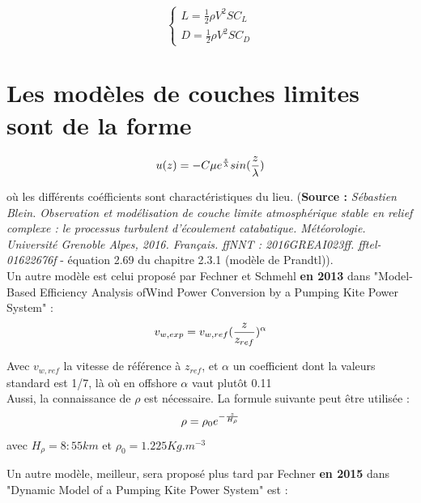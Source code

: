 \begin{equation}
    \begin{cases}
        L = \frac{1}{2} \rho V^2 SC_L \\
        D = \frac{1}{2} \rho V^2 SC_D 
    \end{cases}
    \label{eq:clcd}
\end{equation}

\section{Les modèles de couches limites sont de la forme } 
\label{sec:Ch2.4}

\begin{equation}
        u(z) = -C \mu e^{\frac{z}{\lambda}} sin(\frac{z}{\lambda}) \\
\end{equation}

où les différents coéfficients sont charactéristiques du lieu. (\textbf{Source :} \textit{Sébastien Blein. Observation et modélisation de couche limite atmosphérique stable en relief complexe : le processus turbulent d’écoulement catabatique. Météorologie. Université Grenoble Alpes, 2016. Français. ffNNT : 2016GREAI023ff. fftel-01622676f} - équation 2.69 du chapitre 2.3.1 (modèle de Prandtl)). \\

Un autre modèle est celui proposé par Fechner et Schmehl \textbf{en 2013} dans "Model-Based Efficiency Analysis ofWind Power Conversion by a Pumping Kite Power System" :  
\begin{equation}
    v_{w,exp} = v_{w,ref} (\frac{z}{ z_{ref} })^{\alpha} \\
    \label{eq:fechner2013}
\end{equation}

Avec $v_{w,ref}$ la vitesse de référence à $z_{ref}$, et $\alpha$ un coefficient dont la valeurs standard est 1/7, là où en offshore $\alpha$ vaut plutôt 0.11\\

Aussi, la connaissance de $\rho$ est nécessaire. La formule suivante peut être utilisée :
\begin{equation}
    \rho = \rho_{0} e^{-\frac{z}{H_{\rho}}} \\
\end{equation}
avec $H_{\rho} = 8:55 km$ et $\rho_{0} = 1.225 Kg.m^{-3}$

Un autre modèle, meilleur, sera proposé plus tard par Fechner \textbf{en 2015} dans "Dynamic Model of a Pumping Kite Power System" est : 

